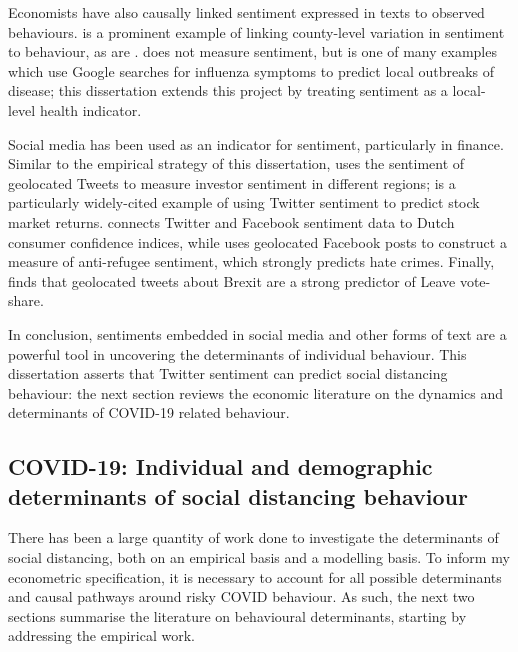 \documentclass{article}
\begin{document}
Economists have also causally linked sentiment expressed in texts to observed behaviours. \textcite{stephens-davidowitzCostRacialAnimus2014} is a prominent example of linking county-level variation in sentiment to behaviour, as are \textcite{choiPredictingPresentGoogle2012,saizProxyingUnobservableVariables2013}. \textcite{ginsbergDetectingInfluenzaEpidemics2009} does not measure sentiment, but is one of many examples which use Google searches for influenza symptoms to predict local outbreaks of disease; this dissertation extends this project by treating sentiment as a local-level health indicator. 

Social media has been used as an indicator for sentiment, particularly in finance. Similar to the empirical strategy of this dissertation, \textcite{affusoSocialMediaSentiment2019} uses the sentiment of geolocated Tweets to measure investor sentiment in different regions; \textcite{bollenTwitterMoodPredicts2011} is a particularly widely-cited example of using Twitter sentiment to predict stock market returns. \textcite{daasSocialMediaSentiment2014} connects Twitter and Facebook sentiment data to Dutch consumer confidence indices, while \textcite{mullerFanningFlamesHate2020} uses geolocated Facebook posts to construct a measure of anti-refugee sentiment, which strongly predicts hate crimes. Finally, \textcite{gorodnichenkoSocialMediaSentiment2018} finds that geolocated tweets about Brexit are a strong predictor of Leave vote-share.

In conclusion, sentiments embedded in social media and other forms of text are a powerful tool in uncovering the determinants of individual behaviour. This dissertation asserts that Twitter sentiment can predict social distancing behaviour: the next section reviews the economic literature on the dynamics and determinants of COVID-19 related behaviour.
\subsection{COVID-19: Individual and demographic determinants of social distancing behaviour}
There has been a large quantity of work done to investigate the determinants of social distancing, both on an empirical basis and a modelling basis. To inform my econometric specification, it is necessary to account for all possible determinants and causal pathways around risky COVID behaviour. As such, the next two sections summarise the literature on behavioural determinants, starting by addressing the empirical work.
\end{document}
